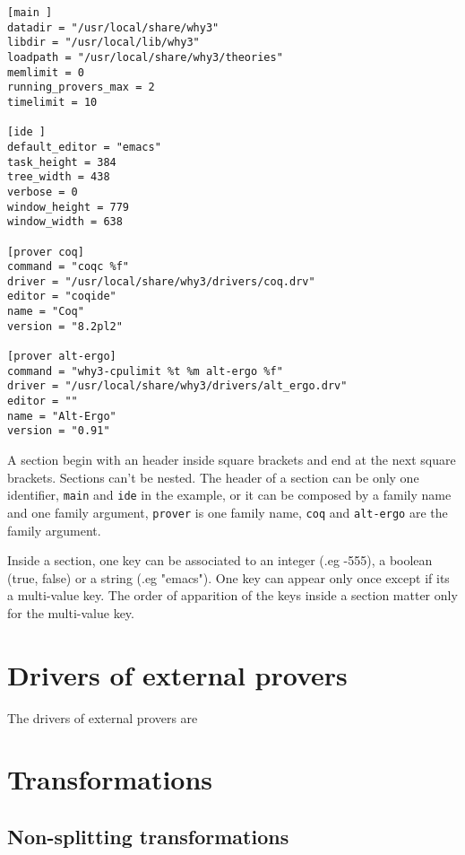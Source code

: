 \begin{verbatim}
[main ]
datadir = "/usr/local/share/why3"
libdir = "/usr/local/lib/why3"
loadpath = "/usr/local/share/why3/theories"
memlimit = 0
running_provers_max = 2
timelimit = 10

[ide ]
default_editor = "emacs"
task_height = 384
tree_width = 438
verbose = 0
window_height = 779
window_width = 638

[prover coq]
command = "coqc %f"
driver = "/usr/local/share/why3/drivers/coq.drv"
editor = "coqide"
name = "Coq"
version = "8.2pl2"

[prover alt-ergo]
command = "why3-cpulimit %t %m alt-ergo %f"
driver = "/usr/local/share/why3/drivers/alt_ergo.drv"
editor = ""
name = "Alt-Ergo"
version = "0.91"
\end{verbatim}

A section begin with an header inside square brackets and end at the
next square brackets. Sections can't be nested. The header of a
section can be only one identifier, \texttt{main} and \texttt{ide} in
the example, or it can be composed by a family name and one family
argument, \texttt{prover} is one family name, \texttt{coq} and
\texttt{alt-ergo} are the family argument.


Inside a section, one key can be associated to an integer (.eg -555),
a boolean (true, false) or a string (.eg "emacs"). One key can appear
only once except if its a multi-value key. The order of apparition of
the keys inside a section matter only for the multi-value key.

\section{Drivers of external provers}
The drivers of external provers are 

\section{Transformations}
\label{sec:transformations}

\subsection{Non-splitting transformations}

